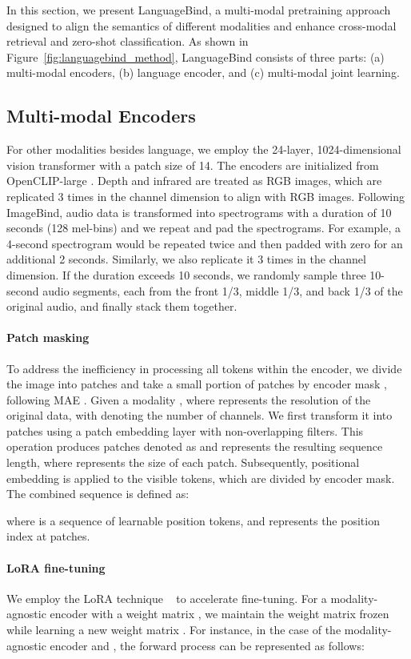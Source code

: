 \documentclass{article} \usepackage{iclr2024_conference,times}
\begin{document}
In this section, we present LanguageBind, a multi-modal pretraining approach designed to align the semantics of different modalities and enhance cross-modal retrieval and zero-shot classification. As shown in Figure~\ref{fig:languagebind_method}, LanguageBind consists of three parts: (a) multi-modal encoders, (b) language encoder, and (c) multi-modal joint learning.

\subsection{Multi-modal Encoders}
\label{section: Multi-modal Encoders}
For other modalities besides language, we employ the 24-layer, 1024-dimensional vision transformer with a patch size of 14. The encoders are initialized from OpenCLIP-large \citep{ilharco_gabriel_2021_5143773}. Depth and infrared are treated as RGB images, which are replicated 3 times in the channel dimension to align with RGB images. Following ImageBind, audio data is transformed into spectrograms with a duration of 10 seconds (128 mel-bins) and we repeat and pad the spectrograms. For example, a 4-second spectrogram would be repeated twice and then padded with zero for an additional 2 seconds. Similarly, we also replicate it 3 times in the channel dimension. If the duration exceeds 10 seconds, we randomly sample three 10-second audio segments, each from the front 1/3, middle 1/3, and back 1/3 of the original audio, and finally stack them together.

\paragraph{Patch masking} To address the inefficiency in processing all tokens within the encoder, we divide the image into patches and take a small portion of patches by encoder mask , following MAE \citep{he2022masked}. Given a modality , where  represents the resolution of the original data, with  denoting the number of channels. We first transform it into patches using a patch embedding layer with non-overlapping filters. This operation produces patches denoted as  and  represents the resulting sequence length, where  represents the size of each patch. Subsequently, positional embedding is applied to the visible tokens, which are divided by encoder mask. The combined sequence  is defined as:
	
where  is a sequence of learnable position tokens, and  represents the position index at patches.
 
\paragraph{LoRA fine-tuning} We employ the LoRA technique ~\citep{hu2021lora} to accelerate fine-tuning. For a modality-agnostic encoder with a weight matrix , we maintain the weight matrix  frozen while learning a new weight matrix . For instance, in the case of the modality-agnostic encoder  and , the forward process can be represented as follows:
\end{document}
